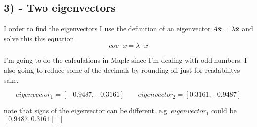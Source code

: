 \subsection{3) - Two eigenvectors}
I order to find the eigenvectors I use the definition of an eigenvector $A\bar{\textbf{x}} = \lambda\bar{\textbf{x}}$
and solve this this equation.
$$cov \cdot \bar{x} = \lambda \cdot \bar{x}$$

I'm going to do the calculations in Maple since I'm dealing with odd numbers. I also going to
reduce some of the decimals by rounding off just for readabilitys sake.

$$eigenvector_1 = [-0.9487, -0.3161] \quad \quad eigenvector_2 = [0.3161, -0.9487]$$

\noindent note that signs of the eigenvector can be different. e.g. $eigenvector_1$ could be $[0.9487, 0.3161][]$

\newpage